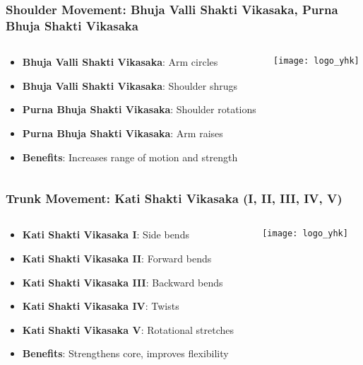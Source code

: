 \begin{frame}[fragile]\frametitle{Shoulder Movement: Bhuja Valli Shakti Vikasaka, Purna Bhuja Shakti Vikasaka}
\begin{columns}
    \begin{column}[T]{0.5\linewidth}
      \begin{itemize}
		\item \textbf{Bhuja Valli Shakti Vikasaka}: Arm circles
		\item \textbf{Bhuja Valli Shakti Vikasaka}: Shoulder shrugs
		\item \textbf{Purna Bhuja Shakti Vikasaka}: Shoulder rotations
		\item \textbf{Purna Bhuja Shakti Vikasaka}: Arm raises
		\item \textbf{Benefits}: Increases range of motion and strength
	  \end{itemize}
    \end{column}
    \begin{column}[T]{0.5\linewidth}
		\begin{center}
		\texttt{[image: logo\_yhk]}
		\end{center}	
    \end{column}
\end{columns}
\end{frame}

\begin{frame}[fragile]\frametitle{Trunk Movement: Kati Shakti Vikasaka (I, II, III, IV, V)}
\begin{columns}
    \begin{column}[T]{0.5\linewidth}
      \begin{itemize}
		\item \textbf{Kati Shakti Vikasaka I}: Side bends
		\item \textbf{Kati Shakti Vikasaka II}: Forward bends
		\item \textbf{Kati Shakti Vikasaka III}: Backward bends
		\item \textbf{Kati Shakti Vikasaka IV}: Twists
		\item \textbf{Kati Shakti Vikasaka V}: Rotational stretches
		\item \textbf{Benefits}: Strengthens core, improves flexibility
	  \end{itemize}
    \end{column}
    \begin{column}[T]{0.5\linewidth}
		\begin{center}
		\texttt{[image: logo\_yhk]}
		\end{center}	
    \end{column}
\end{columns}
\end{frame}

